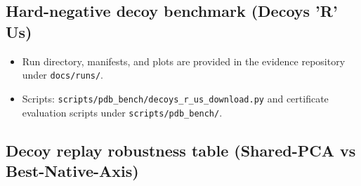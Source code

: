 \subsection*{Hard-negative decoy benchmark (Decoys 'R' Us)}
\begin{itemize}
  \item Run directory, manifests, and plots are provided in the evidence repository under \texttt{docs/runs/}.
  \item Scripts: \texttt{scripts/pdb\_bench/decoys\_r\_us\_download.py} and certificate evaluation scripts under \texttt{scripts/pdb\_bench/}.
\end{itemize}

\subsection*{Decoy replay robustness table (Shared-PCA vs Best-Native-Axis)}
